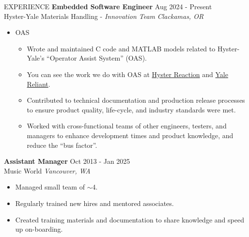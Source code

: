 \documentclass{resume} %
\begin{document}
	\begin{rSection}{EXPERIENCE}
		\textbf{Embedded Software Engineer} \hfill Aug 2024 - Present \\
		Hyster-Yale Materials Handling - \textit{Innovation Team} \hfill \textit{Clackamas, OR}
		\begin{itemize} \itemsep -5pt {}
			\item OAS
			\begin{itemize} \itemsep -5pt {}
				\item Wrote and maintained C code and MATLAB models related to Hyster-Yale's ``Operator Assist System'' (OAS). 
				\item You can see the work we do with OAS at \href{https://www.hyster.com/en-us/north-america/technology/telematics/hyster-reaction/}{Hyster Reaction} and \href{https://www.yale.com/en-us/north-america/technology/yale-reliant/}{Yale Reliant}.
				
				\item Contributed to technical documentation and production release processes to ensure product quality, life-cycle, and industry standards were met.
				\item Worked with cross-functional teams of other engineers, testers, and managers to enhance development times and product knowledge, and reduce the ``bus factor''.
			\end{itemize}
			
			
		\end{itemize}
	
		\textbf{Assistant Manager} \hfill Oct 2013 - Jan 2025 \\
		Music World \hfill \textit{Vancouver, WA}
		\begin{itemize} \itemsep -5pt {} 
			\item Managed small team of $\sim$4.
			\item Regularly trained new hires and mentored associates. 
			\item Created training materials and documentation to share knowledge and speed up on-boarding.
		\end{itemize}
	\end{rSection} 

	
\end{document}
